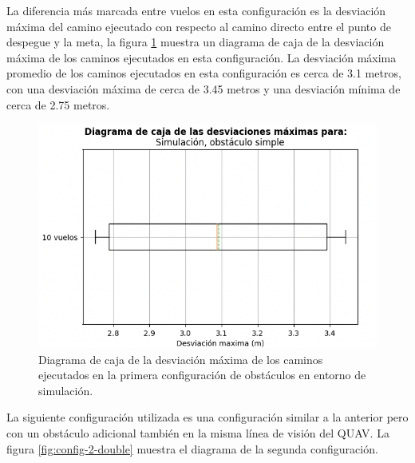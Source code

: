 La diferencia más marcada entre vuelos en esta configuración es la desviación máxima del camino ejecutado con respecto al camino directo entre el punto de despegue y la meta, la figura \ref{fig:single-max-deviation} muestra un diagrama de caja de la desviación máxima de los caminos ejecutados en esta configuración. La desviación máxima promedio de los caminos ejecutados en esta configuración es cerca de 3.1 metros, con una desviación máxima de cerca de 3.45 metros y una desviación mínima de cerca de 2.75 metros.

\begin{figure}[H]
    \centering
    \includegraphics[scale=0.55]{partes/img/sim-single-panel-box.png}
    \caption[Diagrama de caja de la desviación máxima de los caminos ejecutados en la primera configuración de obstáculos en entorno de simulación.]{Diagrama de caja de la desviación máxima de los caminos ejecutados en la primera configuración de obstáculos en entorno de simulación.}
    \label{fig:single-max-deviation}
\end{figure}

La siguiente configuración utilizada es una configuración similar a la anterior pero con un obstáculo adicional también en la misma línea de visión del QUAV. La figura \ref{fig:config-2-double} muestra el diagrama de la segunda configuración.

